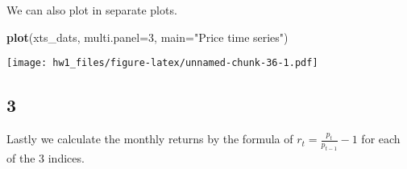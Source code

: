 \documentclass[
]{article}
\newenvironment{Shaded}{\begin{snugshade}}{\end{snugshade}}
\newcommand{\AttributeTok}[1]{\textcolor[rgb]{0.13,0.29,0.53}{#1}}
\newcommand{\DecValTok}[1]{\textcolor[rgb]{0.00,0.00,0.81}{#1}}
\newcommand{\FunctionTok}[1]{\textcolor[rgb]{0.13,0.29,0.53}{\textbf{#1}}}
\newcommand{\NormalTok}[1]{#1}
\newcommand{\StringTok}[1]{\textcolor[rgb]{0.31,0.60,0.02}{#1}}
\begin{document}
We can also plot in separate plots.

\begin{Shaded}
\begin{Highlighting}[]
\FunctionTok{plot}\NormalTok{(xts\_dats, }\AttributeTok{multi.panel=}\DecValTok{3}\NormalTok{, }\AttributeTok{main=}\StringTok{"Price time series"}\NormalTok{)}
\end{Highlighting}
\end{Shaded}

\texttt{[image: hw1\_files/figure-latex/unnamed-chunk-36-1.pdf]}

\subsection{3}\label{section-11}

Lastly we calculate the monthly returns by the formula of
\(r_t = \frac{p_t}{p_{t-1}} - 1\) for each of the 3 indices.
\end{document}
